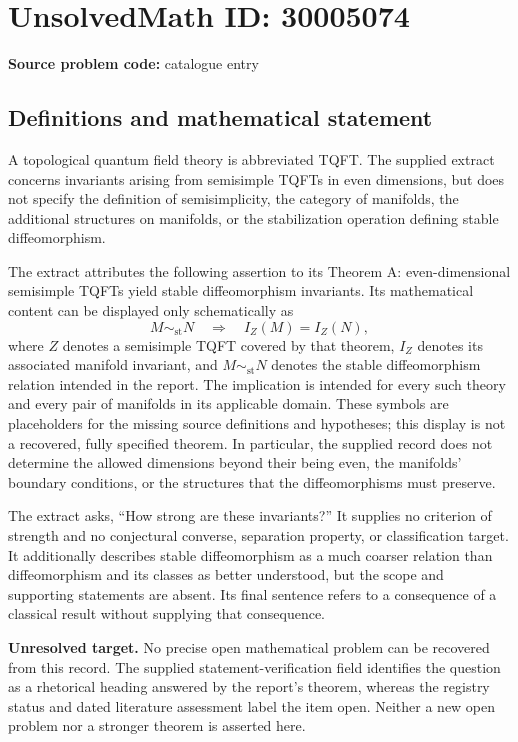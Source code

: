 \documentclass[11pt]{article}
\begin{document}
\section*{UnsolvedMath ID: 30005074}
\textbf{Source problem code:} catalogue entry
\subsection{Definitions and mathematical statement}
A topological quantum field theory is abbreviated TQFT. The supplied extract concerns invariants arising from semisimple TQFTs in even dimensions, but does not specify the definition of semisimplicity, the category of manifolds, the additional structures on manifolds, or the stabilization operation defining stable diffeomorphism.

The extract attributes the following assertion to its Theorem A: even-dimensional semisimple TQFTs yield stable diffeomorphism invariants. Its mathematical content can be displayed only schematically as
\[
M\sim_{\mathrm{st}}N\quad\Longrightarrow\quad I_Z(M)=I_Z(N),
\]
where \(Z\) denotes a semisimple TQFT covered by that theorem, \(I_Z\) denotes its associated manifold invariant, and \(M\sim_{\mathrm{st}}N\) denotes the stable diffeomorphism relation intended in the report. The implication is intended for every such theory and every pair of manifolds in its applicable domain. These symbols are placeholders for the missing source definitions and hypotheses; this display is not a recovered, fully specified theorem. In particular, the supplied record does not determine the allowed dimensions beyond their being even, the manifolds' boundary conditions, or the structures that the diffeomorphisms must preserve.

The extract asks, ``How strong are these invariants?'' It supplies no criterion of strength and no conjectural converse, separation property, or classification target. It additionally describes stable diffeomorphism as a much coarser relation than diffeomorphism and its classes as better understood, but the scope and supporting statements are absent. Its final sentence refers to a consequence of a classical result without supplying that consequence.

\textbf{Unresolved target.} No precise open mathematical problem can be recovered from this record. The supplied statement-verification field identifies the question as a rhetorical heading answered by the report's theorem, whereas the registry status and dated literature assessment label the item open. Neither a new open problem nor a stronger theorem is asserted here.
\end{document}
